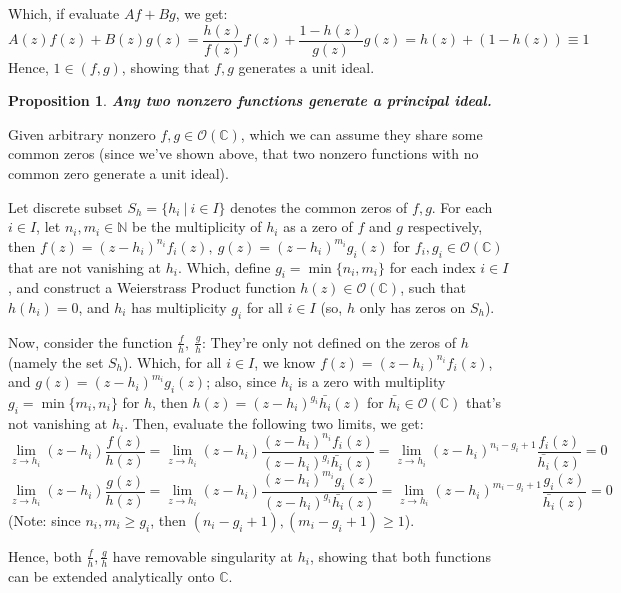 \documentclass{article}
\newtheorem{proposition}{Proposition}
\begin{document}
\begin{itemize}
    Which, if evaluate $Af+Bg$, we get:
    $$A(z)f(z)+B(z)g(z)=\frac{h(z)}{f(z)}f(z)+\frac{1-h(z)}{g(z)}g(z)=h(z)+(1-h(z))\equiv 1$$
    Hence, $1\in (f,g)$, showing that $f,g$ generates a unit ideal.

    \hfil

    \begin{proposition}
        \textbf{Any two nonzero functions generate a principal ideal.}
    \end{proposition}

    Given arbitrary nonzero $f,g\in\mathcal{O}(\mathbb{C})$, which we can assume they share some common zeros (since we've shown above, that two nonzero functions with no common zero generate a unit ideal).

    Let discrete subset $S_h=\{h_i\ |\ i\in I\}$ denotes the common zeros of $f,g$. For each $i\in I$, let $n_i,m_i\in\mathbb{N}$ be the multiplicity of $h_i$ as a zero of $f$ and $g$ respectively, then $f(z)=(z-h_i)^{n_i}f_i(z),\ g(z)=(z-h_i)^{m_i}g_i(z)$ for $f_i,g_i\in\mathcal{O}(\mathbb{C})$ that are not vanishing at $h_i$. Which, define $g_i=\min\{n_i,m_i\}$ for each index $i\in I$,
    and construct a Weierstrass Product function $h(z)\in\mathcal{O}(\mathbb{C})$, such that $h(h_i)=0$, and $h_i$ has multiplicity $g_i$ for all $i\in I$ (so, $h$ only has zeros on $S_h$).

    Now, consider the function $\frac{f}{h},\ \frac{g}{h}$: They're only not defined on the zeros of $h$ (namely the set $S_h$). Which, for all $i\in I$, we know $f(z)=(z-h_i)^{n_i}f_i(z)$, and $g(z)=(z-h_i)^{m_i}g_i(z)$;
    also, since $h_i$ is a zero with multiplity $g_i=\min\{m_i,n_i\}$ for $h$, then $h(z)=(z-h_i)^{g_i}\bar{h_i}(z)$ for $\bar{h_i}\in \mathcal{O}(\mathbb{C})$ that's not vanishing at $h_i$.
    Then, evaluate the following two limits, we get:
    $$\lim_{z\rightarrow h_i}(z-h_i)\frac{f(z)}{h(z)}=\lim_{z\rightarrow h_i}(z-h_i)\frac{(z-h_i)^{n_i}f_i(z)}{(z-h_i)^{g_i}\bar{h_i}(z)} = \lim_{z\rightarrow h_i}(z-h_i)^{n_i-g_i+1}\frac{f_i(z)}{\bar{h_i}(z)}=0$$
    $$\lim_{z\rightarrow h_i}(z-h_i)\frac{g(z)}{h(z)}=\lim_{z\rightarrow h_i}(z-h_i)\frac{(z-h_i)^{m_i}g_i(z)}{(z-h_i)^{g_i}\bar{h_i}(z)} = \lim_{z\rightarrow h_i}(z-h_i)^{m_i-g_i+1}\frac{g_i(z)}{\bar{h_i}(z)}=0$$
    (Note: since $n_i,m_i\geq g_i$, then $(n_i-g_i+1),(m_i-g_i+1)\geq 1$).

    Hence, both $\frac{f}{h},\frac{g}{h}$ have removable singularity at $h_i$, showing that both functions can be extended analytically onto $\mathbb{C}$.


\end{itemize}
\end{document}
